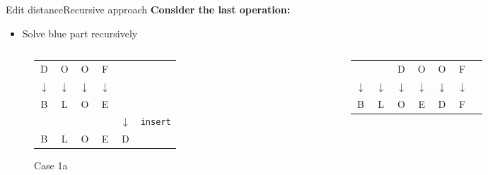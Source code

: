 
\begin{frame}{Edit distance}{Recursive approach}
  \textbf{Consider the last operation:}
  \begin{itemize}
    \item<2->
      Solve {\color{Mittel-Blau}blue} part recursively
  \end{itemize}
  \begin{columns}[T]
    \begin{column}{0.3\linewidth}
      \begin{figure}[!h]
        \begin{center}
          \begin{tabular}{c@{}c@{}c@{}c@{}c@{}l}
            \color{Mittel-Blau}D & \color{Mittel-Blau}O & \color{Mittel-Blau}O &
            \color{Mittel-Blau}F\\
            \color{Mittel-Blau}$\downarrow$ & \color{Mittel-Blau}$\downarrow$ &
            \color{Mittel-Blau}$\downarrow$ & \color{Mittel-Blau}$\downarrow$\\
            \color{Mittel-Blau}B & \color{Mittel-Blau}L & \color{Mittel-Blau}O &
            \color{Mittel-Blau}E\\
            {} & {} & {} & {} & $\downarrow$ & \texttt{insert}\\
            B & L & O & E & D
          \end{tabular}
        \end{center}
        \caption{Case 1a}
      \end{figure}
    \end{column}
    \begin{column}{0.3\linewidth}
      \begin{figure}[!h]
        \begin{center}
          \begin{tabular}{c@{}c@{}c@{}c@{}c@{}c@{}l}
            {} & {} & \color{Mittel-Blau}D & \color{Mittel-Blau}O &
            \color{Mittel-Blau}O & \color{Mittel-Blau}F\\
            \color{Mittel-Blau}$\downarrow$ & \color{Mittel-Blau}$\downarrow$ &
            \color{Mittel-Blau}$\downarrow$ & \color{Mittel-Blau}$\downarrow$ &
            \color{Mittel-Blau}$\downarrow$ & \color{Mittel-Blau}$\downarrow$\\
            \color{Mittel-Blau}B & \color{Mittel-Blau}L & \color{Mittel-Blau}O &
            \color{Mittel-Blau}E & \color{Mittel-Blau}D & \color{Mittel-Blau}F\\

\end{tabular}
\end{center}
\end{figure}
\end{column}
\end{columns}
\end{frame}
